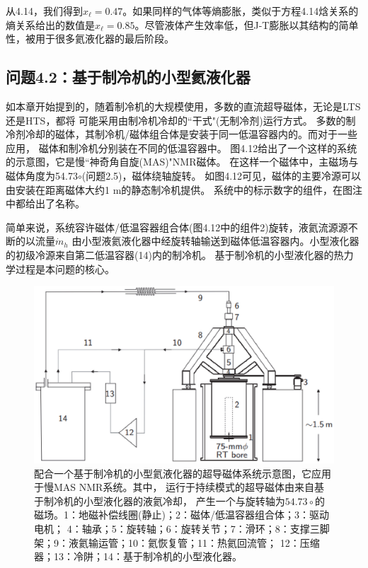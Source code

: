 从4.14，我们得到$x_\ell=0.47$。如果同样的气体等熵膨胀，类似于方程4.14焓关系的熵关系给出的数值是$x_\ell=0.85$。尽管液体产生效率低，但J-T膨胀以其结构的简单性，被用于很多氦液化器的最后阶段。


\subsection{问题4.2：基于制冷机的小型氦液化器}
如本章开始提到的，随着制冷机的大规模使用，多数的直流超导磁体，无论是LTS还是HTS，都将
可能采用由制冷机冷却的``干式"(无制冷剂)运行方式。
多数的制冷剂冷却的磁体，其制冷机/磁体组合体是安装于同一低温容器内的。而对于一些应用，
磁体和制冷机分别装在不同的低温容器中。
图4.12给出了一个这样的系统的示意图，它是慢``神奇角自旋(MAS)"NMR磁体。
在这样一个磁体中，主磁场与磁体角度为54.73$\circ$(问题2.5)，磁体绕轴旋转。
如图4.12可见，磁体的主要冷源可以由安装在距离磁体大约1 m的静态制冷机提供。 
系统中的标示数字的组件，在图注中都给出了名称。

简单来说，系统容许磁体/低温容器组合体(图4.12中的组件2)旋转，液氦流源源不断的以流量$\dot{m}_h$
由小型液氦液化器中经旋转轴输送到磁体低温容器内。小型液化器的初级冷源来自第二低温容器(14)内的制冷机。
基于制冷机的小型液化器的热力学过程是本问题的核心。
\begin{figure}[htbp]
	\centering
	\includegraphics[scale=0.7]{chpt4/figs/fig4.12.eps}
	\caption{配合一个基于制冷机的小型氦液化器的超导磁体系统示意图，它应用于慢MAS NMR系统。其中，
	运行于持续模式的超导磁体由来自基于制冷机的小型液化器的液氦冷却，
	产生一个与旋转轴为$54.73\circ$的磁场。1：地磁补偿线圈(静止)；2：磁体/低温容器组合体；3：驱动电机；
4：轴承；5：旋转轴；6：旋转关节；7：滑环；8：支撑三脚架；9：液氦输运管；10：氦恢复管；11：热氦回流管；
12：压缩器；13：冷阱；14：基于制冷机的小型液化器。}
\end{figure}

